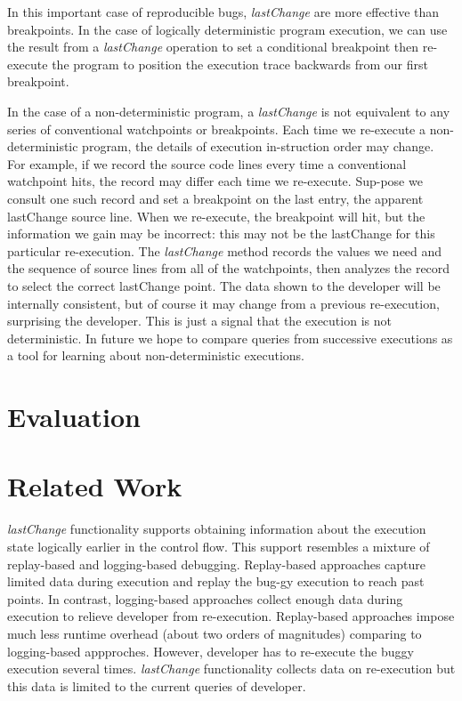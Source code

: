 \documentclass[preprint]{sigplanconf}
\begin{document}
In this important case of reproducible bugs, \textit{lastChange} are more effective than breakpoints. In the case of logically deterministic program execution, we can use the result from a \textit{lastChange} operation to set a conditional breakpoint then re-execute the program to position the execution trace backwards from our first breakpoint. %

In the case of a non-deterministic program, a \textit{lastChange} is not equivalent to any series of conventional watchpoints or breakpoints. Each time we re-execute a non-deterministic program, the details of execution in-struction order may change. For example, if we record the source code lines every time a conventional watchpoint hits, the record may differ each time we re-execute. Sup-pose we consult one such record and set a breakpoint on the last entry, the apparent lastChange source line. When we re-execute, the breakpoint will hit, but the information we gain may be incorrect: this may not be the lastChange for this particular re-execution. The \textit{lastChange} method records the values we need and the sequence of source lines from all of the watchpoints, then analyzes the record to select the correct lastChange point. The data shown to the developer will be internally consistent, but of course it may change from a previous re-execution, surprising the developer. This is just a signal that the execution is not deterministic. In future we hope to compare queries from successive executions as a tool for learning about non-deterministic executions.

\section{Evaluation}

\section{Related Work}

\textit{lastChange} functionality supports obtaining information about the execution state logically earlier in the control flow. This support resembles a mixture of replay-based and logging-based debugging. Replay-based approaches capture limited data during execution and replay the bug-gy execution to reach past points. In contrast, logging-based approaches collect enough data during execution to relieve developer from re-execution. Replay-based approaches impose much less runtime overhead (about two orders of magnitudes) comparing to logging-based appproches. However, developer has to re-execute the buggy execution several times. \textit{lastChange} functionality collects data on re-execution but this data is limited to the current queries of developer.
\end{document}
